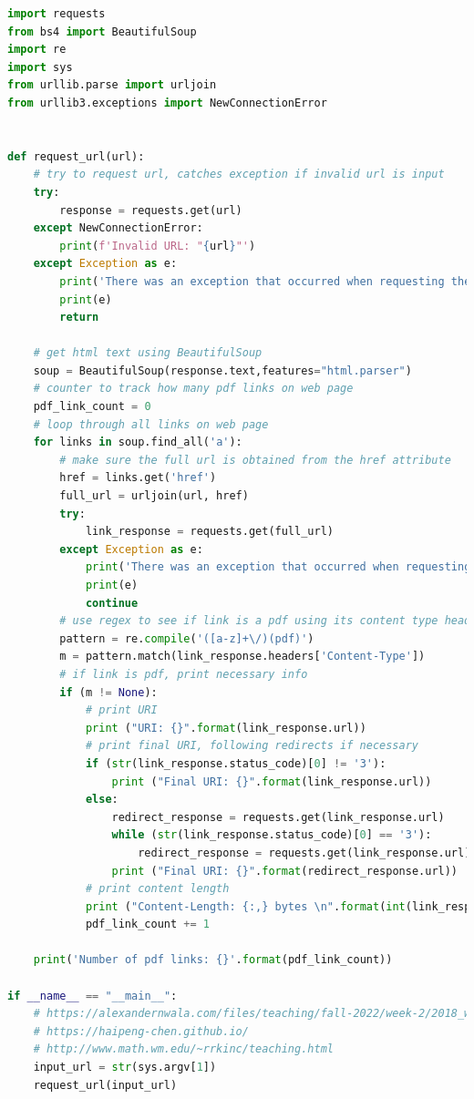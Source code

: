 \documentclass[12pt]{article}
\begin{document}
\begin{lstlisting}[language=python, caption=get\_pdf.py code, label=lst:copy]
import requests
from bs4 import BeautifulSoup
import re
import sys
from urllib.parse import urljoin
from urllib3.exceptions import NewConnectionError


def request_url(url):
    # try to request url, catches exception if invalid url is input
    try:
        response = requests.get(url)
    except NewConnectionError:
        print(f'Invalid URL: "{url}"')
    except Exception as e:
        print('There was an exception that occurred when requesting the URL')
        print(e)
        return

    # get html text using BeautifulSoup
    soup = BeautifulSoup(response.text,features="html.parser")
    # counter to track how many pdf links on web page
    pdf_link_count = 0
    # loop through all links on web page
    for links in soup.find_all('a'):
        # make sure the full url is obtained from the href attribute
        href = links.get('href')
        full_url = urljoin(url, href)
        try:
            link_response = requests.get(full_url)
        except Exception as e:
            print('There was an exception that occurred when requesting the URL')
            print(e)
            continue
        # use regex to see if link is a pdf using its content type header
        pattern = re.compile('([a-z]+\/)(pdf)')
        m = pattern.match(link_response.headers['Content-Type'])
        # if link is pdf, print necessary info
        if (m != None):
            # print URI
            print ("URI: {}".format(link_response.url))
            # print final URI, following redirects if necessary
            if (str(link_response.status_code)[0] != '3'):
                print ("Final URI: {}".format(link_response.url))
            else:
                redirect_response = requests.get(link_response.url)
                while (str(link_response.status_code)[0] == '3'):
                    redirect_response = requests.get(link_response.url)
                print ("Final URI: {}".format(redirect_response.url))
            # print content length
            print ("Content-Length: {:,} bytes \n".format(int(link_response.headers['Content-Length'])))
            pdf_link_count += 1
        
    print('Number of pdf links: {}'.format(pdf_link_count))

if __name__ == "__main__":
    # https://alexandernwala.com/files/teaching/fall-2022/week-2/2018_wsdl_publications.html
    # https://haipeng-chen.github.io/
    # http://www.math.wm.edu/~rrkinc/teaching.html
    input_url = str(sys.argv[1])
    request_url(input_url)
\end{lstlisting}
\end{document}
